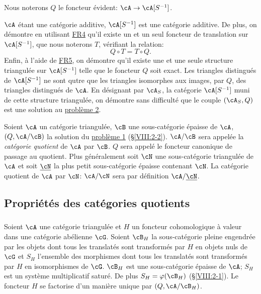 Nous noterons $Q$ le foncteur évident: $\cA\to \cA[S^{-1}]$. 

$\cA$ étant une catégorie additive, $\cA[S^{-1}]$ est une catégorie 
additive. De plus, on démontre en utilisant \hyperlink{VIII:FR4}{FR4} qu'il 
existe un et un seul foncteur de translation sur $\cA[S^{-1}]$, que nous 
noterons $T$, vérifiant la relation: 
\[
  Q\circ T = T\circ Q \text{.}
\]
Enfin, à l'aide de \hyperlink{VIII:FR5}{FR5}, on démontre qu'il existe une 
et une seule structure triangulée sur $\cA[S^{-1}]$ telle que le foncteur $Q$ 
soit exact. Les triangles distingués de $\cA[S^{-1}]$ ne sont qutre que les 
triangles isomorphes aux images, par $Q$, des triangles distingués de $\cA$. 
En désignant par $\cA_S$, la catégorie $\cA[S^{-1}]$ muni de cette 
structure triangulée, on démontre sans difficulté que le couple 
$(\cA_S,Q)$ est une solution au \hyperlink{VIII:prob2}{problème 2}. 





\begin{definition}\label{VIII:2-3-3}
Soient $\cA$ un catégorie triangulée, $\cB$ une sous-catégorie épaisse 
de $\cA$, $(Q,\cA/\cB)$ la solution du \hyperlink{VIII:prob1}{problème 1} 
(\S \ref{VIII:2-2}). $\cA/\cB$ sera appelée la \emph{catégorie quotient} de 
$\cA$ par $\cB$. $Q$ sera appelé le foncteur canonique de passage au 
quotient. Plus généralement soit $\cN$ une sous-catégorie triangulée de 
$\cA$ et soit $\underline\cN$ la plus petit sous-catégorie épaisse 
contenant $\cN$. La catégorie quotient de $\cA$ par $\cN$: $\cA/\cN$ sera par 
définition $\cA/\underline\cN$. 
\end{definition}










\subsection{Propriétés des catégories quotients}\label{VIII:2-4}





\subsubsection{}\label{VIII:2-4-1}

Soient $\cA$ une catégorie triangulée et $H$ un foncteur cohomologique à 
valeur dans une catégorie abélienne $\cG$. Soient $\cB_H$ la 
sous-catégorie pleine engendrée par les objets dont tous les translatés 
sont transformés par $H$ en objets nuls de $\cG$ et $S_H$ l'ensemble des 
morphismes dont tous les translatés sont transformés par $H$ en 
isomorphismes de $\cG$. $\cB_H$ est une sous-catégorie épaisse de $\cA$; 
$S_H$ est un système multiplicatif saturé. De plus $S_H=\varphi(\cB_H)$ 
(\S \ref{VIII:2-1}). Le foncteur $H$ se factorise d'un manière unique par 
$(Q,\cA/\cB_H)$. 





